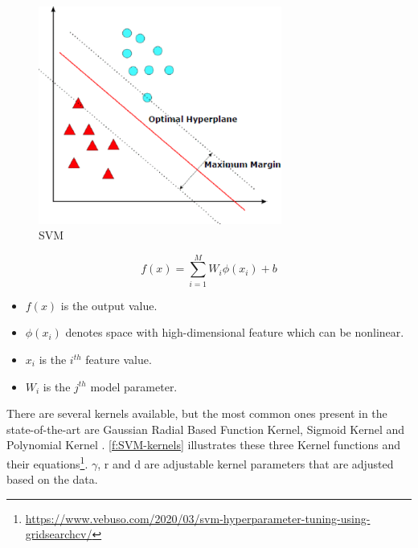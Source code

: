 \begin{figure}[h]
\centering
\includegraphics[width=8cm]{figures/Ch2/SVM.pdf}
\caption{SVM \cite{Hussain2011}}
\label{f:SVM}
\end{figure}

\begin{equation}\label{eq:SVR}
    f(x) = \sum_{i=1}^{M} W_i \phi(x_i) + b
\end{equation}

\begin{itemize}
    \item \begin{math}f(x)\end{math} is the output value.
    \item \begin{math}\phi(x_i)\end{math} denotes space with high-dimensional feature which can be nonlinear.
    \item \begin{math}x_i\end{math} is the \begin{math}i^{th}\end{math} feature value.
    \item \begin{math}W_i\end{math} is the \begin{math}j^{th}\end{math} model parameter.
\end{itemize}

There are several kernels available, but the most common ones present in the state-of-the-art are Gaussian Radial Based Function Kernel, Sigmoid Kernel and Polynomial Kernel \cite{Hussain2011}. \autoref{f:SVM-kernels} illustrates these three Kernel functions and their equations\footnote{\url{https://www.vebuso.com/2020/03/svm-hyperparameter-tuning-using-gridsearchcv/}}.
\begin{math}\gamma \end{math}, r and d are adjustable kernel parameters that are adjusted based on the data.

